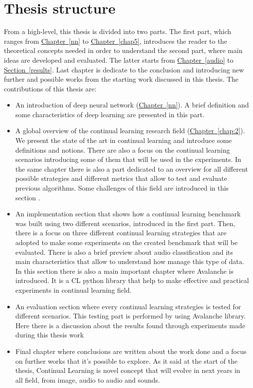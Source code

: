 \documentclass[english, LaM, oneside]{sapthesis}%
\begin{document}
\section{Thesis structure}
From a high-level, this thesis is divided into two parts. The first part, which ranges from \hyperref[nn]{Chapter~\ref*{nn}} to \hyperref[chap5]{Chapter~\ref*{chap5}}, introduces the reader to the theoretical concepts needed in order to understand the second part, where main ideas are developed and evaluated. The latter starts from \hyperref[audio]{Chapter~\ref*{audio}} to \hyperref[results]{Section~\ref*{results}}. Last chapter is dedicate to the conclusion and introducing new further and possible works from the starting work discussed in this thesis.
The contributions of this thesis are:
\begin{itemize}
\item An introduction of deep neural network (\hyperref[nn]{Chapter~\ref*{nn}}). A brief definition and some characteristics of deep learning are presented in this part.
\item A global overview of the continual learning research field (\hyperref[chap:2]{Chapter~\ref*{chap:2}}). We present the state of the art in continual learning and introduce some definitions and notions. There are also a focus on the continual learning scenarios introducing some of them that will be used in the experiments. In the same chapter there is also a part dedicated to an overview for all different possible strategies and different metrics that allow to test and evaluate previous algorithms. Some challenges of this field are introduced in this section .
\item An implementation section that shows how a continual learning benchmark was built using two different scenarios, introduced in the first part. Then, there is a focus on three different continual learning strategies that are adopted to make some experiments on the created benchmark that will be evaluated. There is also a brief preview about audio classification and its main characteristics that allow to understand how manage this type of data. In this section there is also a main important chapter where Avalanche is introduced. It is a CL python library that help to make effective and practical experiments in continual learning field.
\item An evaluation section where every continual learning strategies is tested for different scenarios. This testing part is performed by using Avalanche library. Here there is a discussion about the results found through experiments made during this thesis work
\item Final chapter where conclusions are written about the work done and a focus on further works that it's possible to explore. As it said at the start of the thesis, Continual Learning is novel concept that will evolve in next years in all field, from image, audio to audio and sounds.
\end{itemize}
\end{document}
